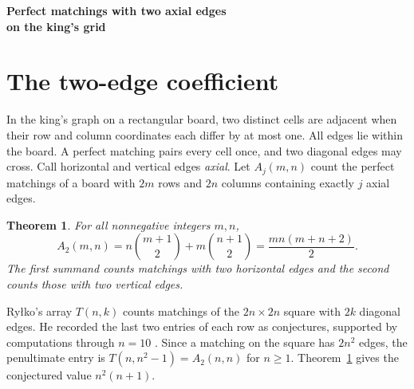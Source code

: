 \documentclass[11pt]{article}
\providecommand{\paperauthor}{}
\newtheorem{theorem}{Theorem}
\newcommand{\A}{A}
\begin{document}
\begin{center}
  {\LARGE\bfseries Perfect matchings with two axial edges\\[2pt]
    on the king's grid\par}
  \ifdefempty{\paperauthor}{}{\medskip{\large\paperauthor\par}}
\end{center}

\begin{abstract}
On a rectangular king's grid, an axial edge joins two cells sharing a
side. We prove that the number of perfect matchings with exactly two axial
edges on a \(2m\times2n\) board is \(mn(m+n+2)/2\). On the square this
gives \(n^2(n+1)\), as conjectured by Ry{\l}ko. A row and column parity
argument forces the two edges to be parallel. The free boundary then
splits the board into independent strips, exactly one of which contains
both edges. A Lean~4 formalization verifies that the strip construction
enumerates each matching exactly once.
\end{abstract}

\section{The two-edge coefficient}

In the king's graph on a rectangular board, two distinct cells are
adjacent when their row and column coordinates each differ by at most
one. All edges lie within the board. A perfect matching pairs every cell
once, and two diagonal edges may cross. Call horizontal and vertical edges
\emph{axial}. Let \(\A_j(m,n)\) count the perfect matchings of a board
with \(2m\) rows and \(2n\) columns containing exactly \(j\) axial edges.

\begin{theorem}\label{thm:main}
For all nonnegative integers \(m,n\),
\[
  \A_2(m,n)
   =n\binom{m+1}{2}+m\binom{n+1}{2}
   =\frac{mn(m+n+2)}{2}.
\]
The first summand counts matchings with two horizontal edges and the
second counts those with two vertical edges.
\end{theorem}

Ry{\l}ko's array \(T(n,k)\) counts matchings of the \(2n\times2n\)
square with \(2k\) diagonal edges. He recorded the last two entries of each
row as conjectures, supported by computations through \(n=10\)
\cite{rylko}. Since a matching on the square has \(2n^2\) edges, the
penultimate entry is \(T(n,n^2-1)=\A_2(n,n)\) for \(n\geq1\).
Theorem~\ref{thm:main} gives the conjectured value \(n^2(n+1)\).
\end{document}
